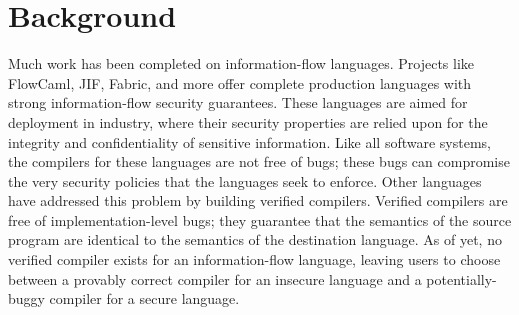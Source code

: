 \section{Background}

Much work has been completed on information-flow languages.  Projects like FlowCaml\cite{simonet2003flow}, JIF\cite{myers2000protecting}, Fabric\cite{liu2009fabric}, and more offer complete production languages with strong information-flow security guarantees.  These languages are aimed for deployment in industry, where their security properties are relied upon for the integrity and confidentiality of sensitive information.  Like all software systems, the compilers for these languages are not free of bugs; these bugs can compromise the very security policies that the languages seek to enforce.  Other languages have addressed this problem by building verified compilers\cite{leroy2012compcert,okuma2003executing,chlipala2010verified,berghofer2004extracting,strecker2002formal,necula1998design,necula2002proof}.  Verified compilers are free of implementation-level bugs; they guarantee that the semantics of the source program are identical to the semantics of the destination language\cite{necula1998design}.  As of yet, no verified compiler exists for an information-flow language, leaving users to choose between a provably correct compiler for an insecure language and a potentially-buggy compiler for a secure language.  


